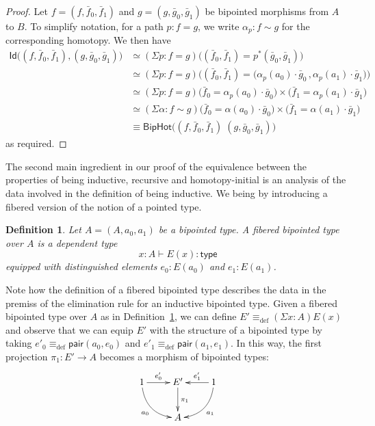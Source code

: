 \documentclass[reqno,10pt,a4paper,oneside]{amsart}
\numberwithin{equation}{section}
\theoremstyle{mythm}
\theoremstyle{mydef}
\newtheorem{definition}[theorem]{Definition}
\theoremstyle{myrmk}
\newcommand{\deq}{\equiv}
\newcommand{\defeq}{\deq_{\mathrm{def}}}
\newcommand{\co}{\colon}
\newcommand{\type}{\mathsf{type}}
\newcommand{\ct}{\cdot}
\newcommand{\pair}{\mathsf{pair}}
\newcommand{\Id}{\mathsf{Id}}
\begin{document}
\begin{proof} Let  $f = (f, \bar{f}_0, \bar{f}_1)$ and $g = (g, \bar{g}_0, \bar{g}_1)$ be bipointed
morphisms from $A$ to $B$. To simplify notation, for a path $p \co f = g$, we write $\alpha_p \co f \sim g$
for the corresponding homotopy. We then have
\begin{align*}
 \Id \big( (f,\bar{f}_0,\bar{f}_1) , (g,\bar{g}_0,\bar{g}_1)  \big)
&  \simeq (\Sigma p : f = g) \big((\bar{f}_0,\bar{f}_1) = p^{\ast} (\bar{g}_0,\bar{g}_1) \big) \\
&  \simeq (\Sigma p : f = g) \big((\bar{f}_0,\bar{f}_1) = \big(\alpha_p(a_0) \ct \bar{g}_0 \, ,  \alpha_p(a_1) \ct \bar{g}_1\big) \big)  \\
&  \simeq (\Sigma p : f = g) \big(\bar{f}_0 = \alpha_p(a_0) \ct \bar{g}_0\big) \times \big( \bar{f}_1 = \alpha_p(a_1) \ct \bar{g}_1 \big) \\
&  \simeq (\Sigma \alpha : f \sim g) \big(\bar{f}_0 = \alpha(a_0) \ct \bar{g}_0\big) \times \big(\bar{f}_1 = \alpha(a_1) \ct \bar{g}_1 \big)  \\
& \deq  \mathsf{BipHot} \big( (f,\bar{f}_0,\bar{f}_1) \; (g,\bar{g}_0,\bar{g}_1) \big)
\end{align*} 
as required.
\end{proof}

The second main ingredient in our proof of the equivalence between the properties of being inductive, recursive and homotopy-initial
is an analysis of the data involved in the definition of being inductive. We being by introducing a fibered version of the notion of a 
pointed type.


\begin{definition} \label{def:fibbipointed}
Let $A = (A, a_0, a_1)$ be a bipointed type. A \emph{fibered bipointed type} over $A$ is a dependent type
\[
x : A \vdash E(x) \co \type
\]
equipped with distinguished elements $e_0 \co E(a_0)$ and $e_1 \co E(a_1)$.
\end{definition}

Note how the definition of a fibered bipointed type describes the data in the premiss of the elimination rule for an inductive bipointed type. Given a 
fibered bipointed type over $A$ as in Definition~\ref{def:fibbipointed}, we can define $E' \defeq (\Sigma x : A) E(x)$ and observe that
we can equip $E'$ with the structure of a bipointed type by taking $e'_0 \defeq \pair(a_0, e_0)$ and $e'_1 \defeq \pair(a_1, e_1)$.
In this way, the first projection $\pi_1 \co E' \to A$ becomes a morphism of bipointed types:
\[
\xymatrix{
1 \ar@/_1pc/[dr]_{a_0} \ar[r]^-{e'_0} & E' \ar[d]^{\pi_1} & 1 \ar[l]_-{e'_1} \ar@/^1pc/[dl]^{a_1} \\ 
 & A & }
 \]
\end{document}

